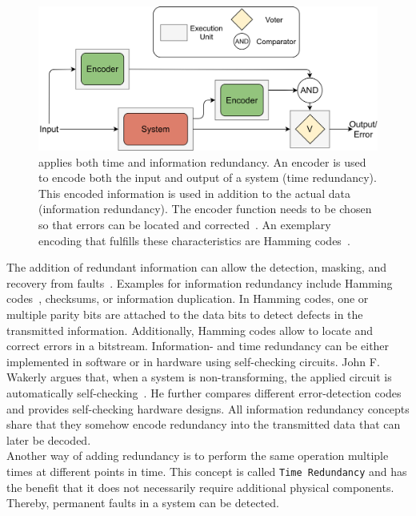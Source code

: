 \begin{figure}[!hb]
	\centering
	\includegraphics[width=0.8\linewidth]{images/ECC}
	\caption{ applies both time and information redundancy. An encoder is used to encode both the input and output of a system (time redundancy). This encoded information is used in addition to the actual data (information redundancy). The encoder function needs to be chosen so that errors can be located and corrected~\cite{Su2005ECC}. An exemplary encoding that fulfills these characteristics are Hamming codes~\cite{HammingCodes}.}
	\label{fig:ECC}
\end{figure}

The addition of redundant information can allow the detection, masking, and recovery from faults~\cite{BarryFaultToleranceAnalysis}.
Examples for information redundancy include Hamming codes~\cite{HammingCodes}, checksums, or information duplication.
In Hamming codes, one or multiple parity bits are attached to the data bits to detect defects in the transmitted information.
Additionally, Hamming codes allow to locate and correct errors in a bitstream.
Information- and time redundancy can be either implemented in software or in hardware using self-checking circuits.
John F. Wakerly argues that, when a system is non-transforming, the applied circuit is automatically self-checking~\cite{SelfCheckingProcessorDesign}.
He further compares different error-detection codes and provides self-checking hardware designs.
All information redundancy concepts share that they somehow encode redundancy into the transmitted data that can later be decoded.
\\

Another way of adding redundancy is to perform the same operation multiple times at different points in time.
This concept is called \texttt{Time Redundancy} and has the benefit that it does not necessarily require additional physical components.
Thereby, permanent faults in a system can be detected.

